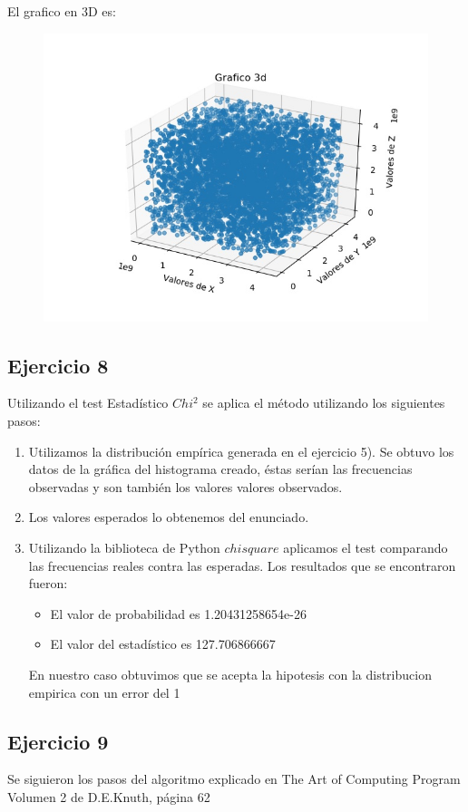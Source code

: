 \documentclass[11pt,a4paper]{article}
\begin{document}
		El grafico en 3D es:
		\begin{figure}[H]
  			\centering
    			\includegraphics[width=14cm]{imagenes/histogramaEjer73d}
		\end{figure}

	\subsection{Ejercicio 8}
	Utilizando el test Estadístico $Chi^2$ se aplica el método utilizando los siguientes pasos:
	\begin{enumerate}
		\item Utilizamos la distribución empírica generada en el ejercicio 5). Se obtuvo los datos de la gráfica del histograma creado, éstas serían las frecuencias observadas y son también los valores valores observados.
		\item Los valores esperados lo obtenemos del enunciado.
		\item Utilizando la biblioteca de Python $chisquare$ aplicamos el test comparando las frecuencias reales contra las esperadas.
		Los resultados que se encontraron fueron:
		\begin{itemize}
			\item El valor de probabilidad es 1.20431258654e-26
			\item El valor del estadístico es 127.706866667
		\end{itemize}
		En nuestro caso obtuvimos que se acepta la hipotesis con la distribucion empirica con un error del 1%
	\end{enumerate}

	\subsection{Ejercicio 9}
	Se siguieron los pasos del algoritmo explicado en The Art of Computing Program Volumen 2 de D.E.Knuth, página 62
\end{document}
